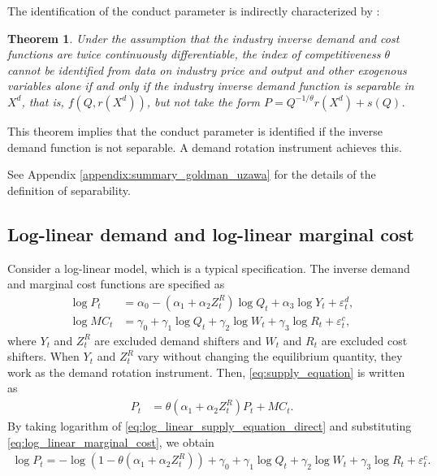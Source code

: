 \documentclass[11pt, a4paper]{article}
\newtheorem{theorem}{Theorem}
\theoremstyle{remark}
\begin{document}
The identification of the conduct parameter is indirectly characterized by \citet{lau1982identifying}:
\begin{theorem}\label{thm:lau_identification}
    Under the assumption that the industry inverse demand and cost functions are twice continuously differentiable, the index of competitiveness $\theta$ cannot be identified from data on industry price and output and other exogenous variables alone if and only if the industry inverse demand function is separable in $X^{d}$, that is, $f(Q, r(X^{d}))$, but not take the form $P = Q^{-1/\theta}r(X^{d}) + s(Q)$.
\end{theorem}
This theorem implies that the conduct parameter is identified if the inverse demand function is not separable.
A demand rotation instrument \citep{bresnahan1982oligopoly} achieves this.

See Appendix \ref{appendix:summary_goldman_uzawa} for the details of the definition of separability.


\subsection{Log-linear demand and log-linear marginal cost}
Consider a log-linear model, which is a typical specification.
The inverse demand and marginal cost functions are specified as
\begin{align}
    \log P_{t} &= \alpha_0 - (\alpha_1 + \alpha_2 Z^{R}_{t}) \log Q_t + \alpha_3 \log Y_t + \varepsilon^{d}_{t},\label{eq:log_linear_demand}\\
    \log MC_t &= \gamma_0 + \gamma_1 \log Q_t +  \gamma_2 \log W_{t} + \gamma_3 \log R_t + \varepsilon^{c}_{t},\label{eq:log_linear_marginal_cost}
\end{align}
where $Y_{t}$ and $Z_t^R$ are excluded demand shifters and $W_t$ and $R_t$ are excluded cost shifters.
When $Y_{t}$ and $Z_{t}^{R}$ vary without changing the equilibrium quantity, they work as the demand rotation instrument.  
Then, \eqref{eq:supply_equation} is written as
\begin{align}
    P_t &= \theta (\alpha_1 + \alpha_2 Z^{R}_{t}) P_t + MC_t.\label{eq:log_linear_supply_equation_direct}
\end{align}
By taking logarithm of \eqref{eq:log_linear_supply_equation_direct} and substituting \eqref{eq:log_linear_marginal_cost}, we obtain
\begin{align}
    \log P_t = - \log(1 - \theta(\alpha_1 + \alpha_2 Z^{R}_{t})) + \gamma_0 + \gamma_1 \log Q_t +  \gamma_2 \log W_{t} + \gamma_3 \log R_t + \varepsilon^{c}_{t}. \label{eq:log_linear_supply_equation}
\end{align}
\end{document}

